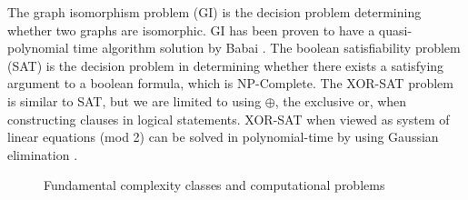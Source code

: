 \par
The graph isomorphism problem (GI) is the decision problem determining whether two graphs are isomorphic. GI has been proven to have a quasi-polynomial time algorithm solution by Babai \cite{babai2016graph}. The boolean satisfiability problem (SAT) is the decision problem in determining whether there exists a satisfying argument to a boolean formula, which is NP-Complete. The XOR-SAT problem is similar to SAT, but we are limited to using $\oplus$, the exclusive or, when constructing clauses in logical statements. XOR-SAT when viewed as system of linear equations (mod 2) can be solved in polynomial-time by using Gaussian elimination \cite{moore2011nature}.
\usetikzlibrary{shapes,backgrounds}
\begin{figure}[htbp!] 
	\centering
	\def\firstcircle{(0,-1.25) circle (0.75cm)}
	\def\secondcircle{(0,0) circle (2cm)}
	\def\thirdcircle{(0,2) circle (1.5cm)}
	\def\myellipse{(0,-1.5) ellipse (1.10cm and 0.5cm)}
	\caption{Fundamental complexity classes and computational problems}
\end{figure}
\newpage

